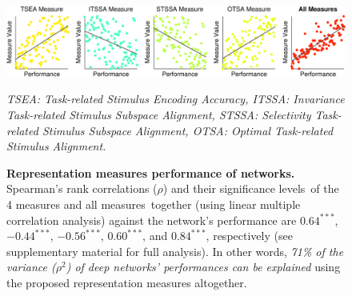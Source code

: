 \documentclass[fleqn]{article} %
\begin{document}

\begin{figure}[t]
\centering 
\begin{minipage}{0.90\textwidth}
\includegraphics[width=\linewidth]{Figs/corr.pdf} \vspace{-1.0ex}
{\tiny \begin{spacing}{1.2} \textsf{\emph{TSEA: Task-related Stimulus Encoding Accuracy, ITSSA: Invariance \vs Task-related Stimulus Subspace Alignment, STSSA: Selectivity \vs Task-related Stimulus Subspace Alignment, OTSA: Optimal \vs Task-related Stimulus Alignment.}} \end{spacing}} \vspace{-0.5ex}
\end{minipage} %
\caption{{\bf Representation measures \vs performance of networks.}
Spearman's rank correlations ($\rho$) and their significance levels\protect{}~of the 4 measures and all measures\protect\footnotemark~together (using linear multiple correlation analysis) against the network's performance are $0.64^{\ast\ast\ast}$, $-0.44^{\ast\ast\ast}$, $-0.56^{\ast\ast\ast}$, $0.60^{\ast\ast\ast}$, and $0.84^{\ast\ast\ast}$, respectively (see supplementary material for full analysis). In other words, \emph{71\% of the variance ($\rho^2$) of deep networks' performances can be explained} using the proposed representation measures altogether.
}
\label{fig:corr}
\end{figure}

\end{document}

